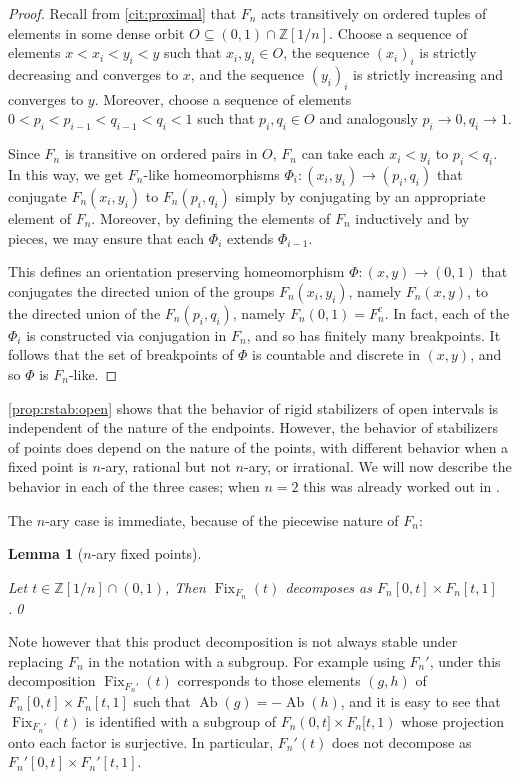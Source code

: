 \documentclass[reqno,12pt]{amsart}\setcounter{tocdepth}{1}
\newtheorem{lemma}[theorem]{Lemma}
\theoremstyle{definition}
\newcommand{\Z}{\mathbb{Z}}
\DeclareMathOperator{\Ab}{Ab}
\DeclareMathOperator{\Fix}{Fix}
\numberwithin{equation}{section}
\begin{document}
\begin{proof}
Recall from \cref{cit:proximal} that $F_n$ acts transitively on ordered tuples of elements in some dense orbit $O\subseteq (0,1)\cap \Z[1/n]$. Choose a sequence of elements $x < x_i < y_i < y$ such that $x_i, y_i \in O$, the sequence $(x_i)_i$ is strictly decreasing and converges to $x$, and the sequence $(y_i)_i$ is strictly increasing and converges to $y$. Moreover, choose a sequence of elements $0 < p_i < p_{i-1} < q_{i-1} < q_i < 1$ such that $p_i, q_i \in O$ and analogously $p_i \to 0, q_i \to 1$.

Since $F_n$ is transitive on ordered pairs in $O$, $F_n$ can take each $x_i<y_i$ to $p_i<q_i$. In this way, we get $F_n$-like homeomorphisms $\Phi_i \colon (x_i, y_i) \to (p_i, q_i)$ that conjugate $F_n(x_i, y_i)$ to $F_n(p_i, q_i)$ simply by conjugating by an appropriate element of $F_n$. Moreover, by defining the elements of $F_n$ inductively and by pieces, we may ensure that each $\Phi_i$ extends $\Phi_{i-1}$.

This defines an orientation preserving homeomorphism $\Phi \colon (x, y) \to (0, 1)$ that conjugates the directed union of the groups $F_n(x_i, y_i)$, namely $F_n(x, y)$, to the directed union of the $F_n(p_i, q_i)$, namely $F_n(0, 1) = F_n^c$. In fact, each of the $\Phi_i$ is constructed via conjugation in $F_n$, and so has finitely many breakpoints. It follows that the set of breakpoints of $\Phi$ is countable and discrete in $(x, y)$, and so $\Phi$ is $F_n$-like.
\end{proof}

\cref{prop:rstab:open} shows that the behavior of rigid stabilizers of open intervals is independent of the nature of the endpoints. However, the behavior of stabilizers of points does depend on the nature of the points, with different behavior when a fixed point is $n$-ary, rational but not $n$-ary, or irrational. We will now describe the behavior in each of the three cases; when $n = 2$ this was already worked out in \cite{golansapir}.

The $n$-ary case is immediate, because of the piecewise nature of $F_n$:

\begin{lemma}[$n$-ary fixed points]
\label{lem:fix:nary}

Let $t \in \Z[1/n] \cap (0, 1)$, Then $\Fix_{F_n}(t)$ decomposes as $F_n[0, t] \times F_n[t, 1]$.\qed
\end{lemma}

Note however that this product decomposition is not always stable under replacing $F_n$ in the notation with a subgroup. For example using $F_n'$, under this decomposition $\Fix_{F_n'}(t)$ corresponds to those elements $(g, h)$ of $F_n[0, t] \times F_n[t, 1]$ such that $\Ab(g) = - \Ab(h)$, and it is easy to see that $\Fix_{F_n'}(t)$ is identified with a subgroup of $F_n(0, t] \times F_n[t, 1)$ whose projection onto each factor is surjective. In particular, $F_n'(t)$ does not decompose as $F_n'[0,t]\times F_n'[t,1]$.
\end{document}
